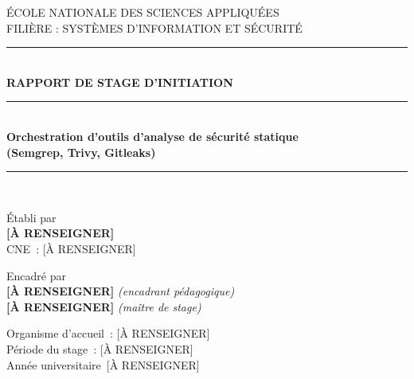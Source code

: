 \documentclass[12pt,a4paper,oneside]{report}
\newcommand{\AuthorName}{[\`A RENSEIGNER]}
\newcommand{\StudentID}{[\`A RENSEIGNER]}
\newcommand{\AcademicYear}{[\`A RENSEIGNER]}
\newcommand{\SupervisorName}{[\`A RENSEIGNER]}
\newcommand{\HostOrg}{[\`A RENSEIGNER]}
\newcommand{\HostSupervisor}{[\`A RENSEIGNER]}
\newcommand{\InternshipPeriod}{[\`A RENSEIGNER]}
\newcommand{\ThemeTitleA}{Orchestration d'outils d'analyse de s\'ecurit\'e statique}
\newcommand{\ThemeTitleB}{(Semgrep, Trivy, Gitleaks)}
\begin{document}
\begin{titlepage}
\thispagestyle{empty}
\begin{center}

{\fontsize{11pt}{14pt}\selectfont\color{muted} \'ECOLE NATIONALE DES SCIENCES APPLIQU\'EES\\
FILI\`ERE : SYST\`EMES D'INFORMATION ET S\'ECURIT\'E}\\[0.3em]
{\color{accentblue}\rule{0.35\linewidth}{0.8pt}}\\[2.2cm]

{\fontsize{13pt}{16pt}\selectfont\color{bluedeep}\bfseries RAPPORT DE STAGE D'INITIATION}\\[2.6cm]

{\color{accentblue}\rule{0.55\linewidth}{1.6pt}}\\[0.9cm]
{\fontsize{20pt}{25pt}\selectfont\bfseries\color{ink} \ThemeTitleA \\[0.35em] \ThemeTitleB}\\[0.9cm]
{\color{accentblue}\rule{0.55\linewidth}{1.6pt}}\\[2.6cm]

\begin{minipage}{0.42\linewidth}
\raggedright
{\small\color{muted} \'Etabli par}\\[0.15em]
{\bfseries \AuthorName}\\
{\small CNE~: \StudentID}
\end{minipage}
\hfill
\begin{minipage}{0.42\linewidth}
\raggedleft
{\small\color{muted} Encadr\'e par}\\[0.15em]
{\bfseries \SupervisorName} \textit{(encadrant p\'edagogique)}\\
{\bfseries \HostSupervisor} \textit{(ma\^itre de stage)}
\end{minipage}

\vfill

{\small\color{muted}
Organisme d'accueil~: \HostOrg\\
P\'eriode du stage~: \InternshipPeriod\\[0.6em]
Ann\'ee universitaire~\AcademicYear}

\end{center}
\end{titlepage}

\end{document}
